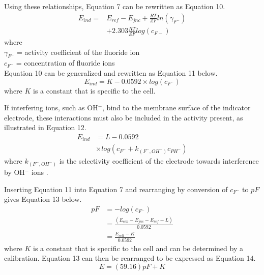 \documentclass[journal=jacsat,manuscript=article,layout=twocolumn]{achemso}
\begin{document}
Using these relationships, Equation 7 can be rewritten as Equation 10.
\begin{equation}
    \begin{aligned}
        E_{ind} = &E_{ref} - E_{jnc} + \frac{RT}{ZF}ln(\gamma_{F^-})  \\
        &+ 2.303 \frac{RT}{ZF} log(c_{F-}) 
    \end{aligned}
\end{equation}
where \\
$\gamma_{F^-}$ = activity coefficient of the fluoride ion \\
$c_{F^-}$ = concentration of fluoride ions \\ 

Equation 10 can be generalized and rewritten as Equation 11 below.
\begin{equation}
    E_{ind} = K - 0.0592\times log(c_{F^-})
\end{equation}
where $K$ is a constant that is specific to the cell.

If interfering ions, such as OH$^-$, bind to the membrane surface of the
indicator electrode, these interactions must also be included in the activity
present, as illustrated in Equation 12.
\begin{equation}
    \begin{aligned}
        E_{ind} &= L - 0.0592  \\
        &\times log (c_{F^-} + k_{(F^-,OH^-)}c_{PH^-})
    \end{aligned}
\end{equation}
where $k_{(F^-,OH^-)}$ is the selectivity coefficient of the electrode towards
interference by OH$^-$ ions \cite{nmt}.

Inserting Equation 11 into Equation 7 and rearranging by conversion of $c_{F^-}$ to $pF$ gives Equation 13 below.
\begin{equation}
    \begin{aligned}
    pF &= -log (c_{F^-}) \\
    &= \frac{(E_{cell} - E_{jnc} - E_{ref} - L)}{0.0592} \\
    &= \frac{E_{cell} - K}{0.0592} 
    \end{aligned}
\end{equation}
where $K$ is a constant that is specific to the cell and can be determined by a
calibration. 
Equation 13 can then be rearranged to be expressed as Equation 14.
\begin{equation}
    E = (59.16) pF + K
\end{equation}
\end{document}
